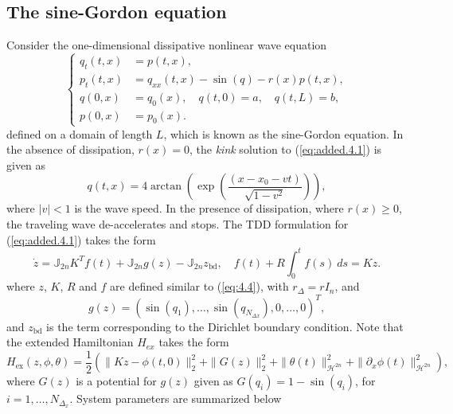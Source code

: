 \subsection{The sine-Gordon equation}
Consider the one-dimensional dissipative nonlinear wave equation
\begin{equation} \label{eq:added.4.1}
	\left\{
	\begin{aligned}
		q_{t}(t,x) &= p(t,x), \\
		p_{t}(t,x) &= q_{xx}(t,x) - \sin(q) - r(x)  p(t,x), \\
		q(0,x) &= q_0(x), \quad q(t,0) = a, \quad q(t,L) = b,\\
		p(0,x) &= p_0(x).
	\end{aligned}
	\right.
\end{equation}
defined on a domain of length $L$, which is known as the sine-Gordon equation. In the absence of dissipation, $r(x) = 0$, the \emph{kink} solution to (\ref{eq:added.4.1}) is given as
\begin{equation} \label{eq:added.4.2}
	q(t,x) = 4\arctan\left( \exp \left( \frac{(x-x_0 - vt)}{\sqrt{1-v^2}} \right) \right),
\end{equation}
where $|v|< 1$ is the wave speed. In the presence of dissipation, where $r(x)\geq 0$, the traveling wave de-accelerates and stops. The TDD formulation for (\ref{eq:added.4.1}) takes the form
\begin{equation} \label{eq:added.4.3}
	\dot z = \mathbb J_{2n} K^T f(t) + \mathbb J_{2n} g(z) - \mathbb J_{2n} z_{\text{bd}}, \quad f(t) + R \int_0^t f(s) \ ds = K z.	
\end{equation}
where $z$, $K$, $R$ and $f$ are defined similar to (\ref{eq:4.4}), with $r_{\Delta} = rI_{n}$, and 
\begin{equation}
g(z) = (\sin(q_1),\dots,\sin(q_{N_{\Delta x}}),0,\dots,0)^T,
\end{equation}
and $z_{\text{bd}}$ is the term corresponding to the Dirichlet boundary condition. Note that the extended Hamiltonian $H_{ex}$ takes the form
\begin{equation}
	H_\text{ex}(z,\phi,\theta) = \frac 1 2 \left( \| Kz - \phi(t,0) \|_2^2 + \| G(z) \|_2^2 + \| \theta(t) \|^2_{\mathcal H^{2n} } + \| \partial_x\phi(t)\|^2_{\mathcal H^{2n} }\right),
\end{equation}
where $G(z)$ is a potential for $g(z)$ given as $G(q_i) = 1 - \sin(q_i)$, for $i=1,\dots,N_{\Delta_x}$. System parameters are summarized below

